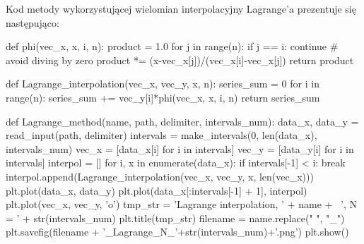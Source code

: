 \documentclass{article}
\begin{document}
\newpage

Kod metody wykorzystującej wielomian interpolacyjny Lagrange'a prezentuje się następująco:

\begin{python}
def phi(vec_x, x, i, n):
    product = 1.0
    for j in range(n):
        if j == i:
            continue  # avoid diving by zero
        product *= (x-vec_x[j])/(vec_x[i]-vec_x[j])
    return product


def Lagrange_interpolation(vec_x, vec_y, x, n):
    series_sum = 0
    for i in range(n):
        series_sum += vec_y[i]*phi(vec_x, x, i, n)
    return series_sum


def Lagrange_method(name, path, delimiter, intervals_num):
    data_x, data_y = read_input(path, delimiter)
    intervals = make_intervals(0, len(data_x), intervals_num)
    vec_x = [data_x[i] for i in intervals]
    vec_y = [data_y[i] for i in intervals]
    interpol = []
    for i, x in enumerate(data_x):
        if intervals[-1] < i:
            break
        interpol.append(Lagrange_interpolation(vec_x, vec_y, x, 
                                               len(vec_x)))
    plt.plot(data_x, data_y)
    plt.plot(data_x[:intervals[-1] + 1], interpol)
    plt.plot(vec_x, vec_y, 'o')
    tmp_str = 'Lagrange interpolation, ' + name + \
              ', N = ' + str(intervals_num)
    plt.title(tmp_str)
    filename = name.replace(" ", "_")
    plt.savefig(filename + '_Lagrange_N_'+str(intervals_num)+'.png')
    plt.show()
\end{python}

\newpage
\end{document}
